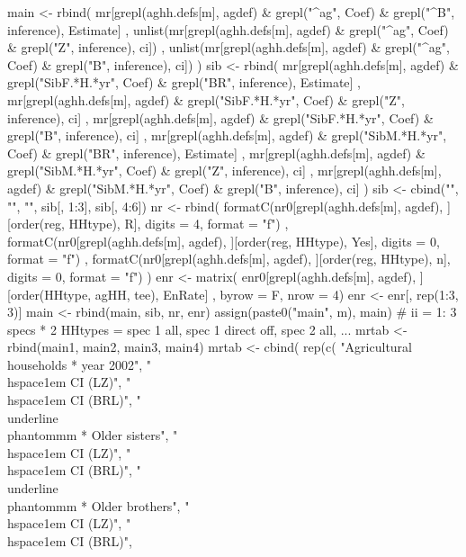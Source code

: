 \begin{Schunk}
\begin{Sinput}
{{{{        main <- rbind(
          mr[grepl(aghh.defs[m], agdef) & grepl("^ag", Coef) & grepl("^B", inference), Estimate]
          ,
          unlist(mr[grepl(aghh.defs[m], agdef) & grepl("^ag", Coef) & grepl("Z", inference), ci])
          ,
          unlist(mr[grepl(aghh.defs[m], agdef) & grepl("^ag", Coef) & grepl("B", inference), ci])
        )
        sib <-  rbind(
           mr[grepl(aghh.defs[m], agdef)  & grepl("SibF.*H.*yr", Coef) & grepl("BR", inference), Estimate]
           , 
           mr[grepl(aghh.defs[m], agdef) & grepl("SibF.*H.*yr", Coef) & grepl("Z", inference), ci]
           ,
           mr[grepl(aghh.defs[m], agdef) & grepl("SibF.*H.*yr", Coef) & grepl("B", inference), ci]
           ,
           mr[grepl(aghh.defs[m], agdef) & grepl("SibM.*H.*yr", Coef) & grepl("BR", inference), Estimate]
           , 
           mr[grepl(aghh.defs[m], agdef) & grepl("SibM.*H.*yr", Coef) & grepl("Z", inference), ci]
           ,
           mr[grepl(aghh.defs[m], agdef) & grepl("SibM.*H.*yr", Coef) & grepl("B", inference), ci]
         )
         sib <- cbind("", "", "", sib[, 1:3], sib[, 4:6])
         nr <- rbind(
            formatC(nr0[grepl(aghh.defs[m], agdef), ][order(reg, HHtype), R], digits = 4, format = "f")
          , formatC(nr0[grepl(aghh.defs[m], agdef), ][order(reg, HHtype), Yes], digits = 0, format = "f")
          , formatC(nr0[grepl(aghh.defs[m], agdef), ][order(reg, HHtype), n], digits = 0, format = "f")
         )
         enr <- matrix(
           enr0[grepl(aghh.defs[m], agdef), ][order(HHtype, agHH, tee), EnRate]
           , byrow = F, nrow = 4)
         enr <- enr[, rep(1:3, 3)]
         main <- rbind(main, sib, nr, enr)
         assign(paste0("main", m), main)
      }
      # ii = 1: 3 specs * 2 HHtypes = spec 1 all, spec 1 direct off, spec 2 all, ...
      mrtab <- rbind(main1, main2, main3, main4)
      mrtab <- 
        cbind(
            rep(c(
              "Agricultural households * year 2002", 
              "\\hspace{1em} CI (LZ)", "\\hspace{1em} CI (BRL)", 
              "\\underline{\\phantom{mm}} * Older sisters",
              "\\hspace{1em} CI (LZ)", "\\hspace{1em} CI (BRL)", 
              "\\underline{\\phantom{mm}} * Older brothers",
              "\\hspace{1em} CI (LZ)", "\\hspace{1em} CI (BRL)", 
}}}
\end{Sinput}
\end{Schunk}
